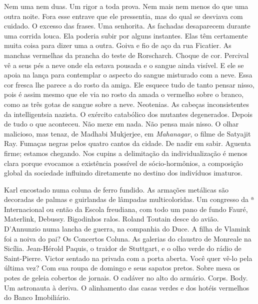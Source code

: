 Nem uma nem duas. Um rigor a toda prova. Nem mais nem menos do que uma
outra noite. Fora esse entrave que ele pressentia, mas do qual se
desviava com cuidado. O excesso das frases. Uma senhorita. As fachadas
desaparecem durante uma corrida louca. Ela poderia subir por alguns
instantes. Elas têm certamente muita coisa para dizer uma a outra. Goiva
e fio de aço da rua Ficatier. As manchas vermelhas da prancha  do
teste de Rorscharch. Choque de cor. Percival vê a seus pés a neve onde
ela estava pousada e o sangue ainda visível. E ele se apoia na lança
para contemplar o aspecto do sangue misturado com a neve. Essa cor
fresca lhe parece a do rosto da amiga. Ele esquece tudo de tanto pensar
nisso, pois é assim mesmo que ele via no rosto da amada o vermelho sobre
o branco, como as três gotas de sangue sobre a neve. Neotenias. As
cabeças inconsistentes da intelligentsia nazista. O exército catabólico
dos mutantes degenerados. Depois de tudo o que aconteceu. Não mexe em
nada. Não pensa mais nisso. O olhar malicioso, mas tenaz, de Madhabi
Mukjerjee, em \emph{Mahanagar}, o filme de Satyajit Ray. Fumaças negras
pelos quatro cantos da cidade. De nadir em sabir. Aguenta firme; estamos
chegando. Nos cupins a delimitação da individualização é menos clara
porque evocamos a existência possível de sócio-hormônios, a composição
global da sociedade influindo diretamente no destino dos indivíduos
imaturos.

Karl encostado numa coluna de ferro fundido. As armações metálicas são
decoradas de palmas e guirlandas de lâmpadas multicoloridas. Um
congresso da ª Internacional ou então da Escola freudiana, com todo um
pano de fundo Fauré, Materlink, Debussy. Bigodinhos ralos. Roland
Toutain desce do avião. D'Annunzio numa lancha de guerra, na companhia
do Duce. A filha de Vlamink foi a noiva do pai? Os Concertos Coluna. As
galerias do claustro de Monreale na Sicília. Jean-Hérold Paquis, o
traidor de Stuttgart, e o olho verde do rádio de Saint-Pierre. Victor
sentado na privada com a porta aberta. Você quer vê-lo pela última vez?
Com sua roupa de domingo e seus sapatos pretos. Sobre mesa os potes de
geleia cobertos de jornais. O cadáver no alto do armário. Corps. Body.
Um astronauta à deriva. O alinhamento das casas verdes e dos hotéis
vermelhos do Banco Imobiliário.

